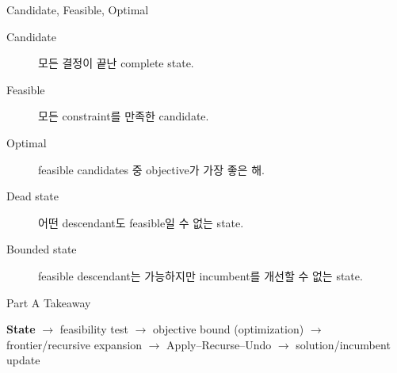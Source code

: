 \begin{frame}{Candidate, Feasible, Optimal}
\begin{description}
\item[Candidate] 모든 결정이 끝난 complete state.
\item[Feasible] 모든 constraint를 만족한 candidate.
\item[Optimal] feasible candidates 중 objective가 가장 좋은 해.
\item[Dead state] 어떤 descendant도 feasible일 수 없는 state.
\item[Bounded state] feasible descendant는 가능하지만 incumbent를 개선할 수 없는 state.
\end{description}
\end{frame}
\begin{frame}{Part A Takeaway}
\begin{center}
\small
\textbf{State}
\(\rightarrow\) feasibility test
\(\rightarrow\) objective bound (optimization)
\(\rightarrow\) frontier/recursive expansion
\(\rightarrow\) Apply--Recurse--Undo
\(\rightarrow\) solution/incumbent update
\end{center}
\end{frame}
